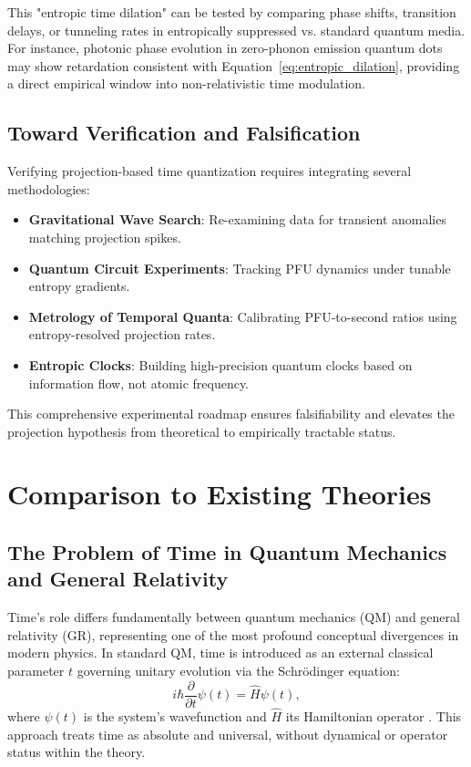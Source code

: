 \documentclass[12pt,a4paper]{article}
\numberwithin{equation}{section}
\begin{document}
This "entropic time dilation" can be tested by comparing phase shifts, transition delays, or tunneling rates in entropically suppressed vs. standard quantum media. For instance, photonic phase evolution in zero-phonon emission quantum dots may show retardation consistent with Equation~\eqref{eq:entropic_dilation}, providing a direct empirical window into non-relativistic time modulation.

\subsection{Toward Verification and Falsification}

Verifying projection-based time quantization requires integrating several methodologies:

\begin{itemize}
    \item \textbf{Gravitational Wave Search}: Re-examining data for transient anomalies matching projection spikes.
    \item \textbf{Quantum Circuit Experiments}: Tracking PFU dynamics under tunable entropy gradients.
    \item \textbf{Metrology of Temporal Quanta}: Calibrating PFU-to-second ratios using entropy-resolved projection rates.
    \item \textbf{Entropic Clocks}: Building high-precision quantum clocks based on information flow, not atomic frequency.
\end{itemize}

This comprehensive experimental roadmap ensures falsifiability and elevates the projection hypothesis from theoretical to empirically tractable status.

\section{Comparison to Existing Theories}
\label{sec:comparison}

\subsection{The Problem of Time in Quantum Mechanics and General Relativity}

Time’s role differs fundamentally between quantum mechanics (QM) and general relativity (GR), representing one of the most profound conceptual divergences in modern physics. In standard QM, time is introduced as an external classical parameter \( t \) governing unitary evolution via the Schrödinger equation:
\begin{equation}
i \hbar \frac{\partial}{\partial t} \psi(t) = \hat{H} \psi(t),
\label{eq:schrodinger}
\end{equation}
where \( \psi(t) \) is the system’s wavefunction and \( \hat{H} \) its Hamiltonian operator \cite{messiah_quantum_1961}. This approach treats time as absolute and universal, without dynamical or operator status within the theory.
\end{document}
